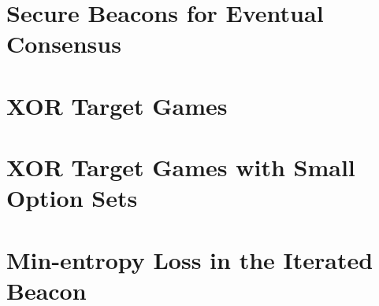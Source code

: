 



\chapter{Secure Beacons for Eventual Consensus}\label{sec:xorgames-intro}



\chapter{XOR Target Games}\label{sec:xor-games}


\chapter{XOR Target Games with Small Option Sets}\label{sec:poisson-bernoulli}



\chapter{Min-entropy Loss in the Iterated Beacon}\label{sec:main-thm-proofs}




